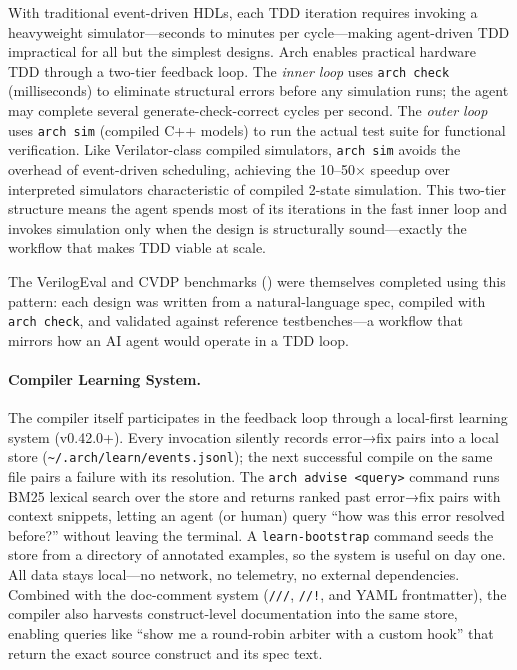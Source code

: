 \documentclass[11pt,twocolumn]{article}
\begin{document}
With traditional event-driven HDLs, each TDD iteration requires invoking a heavyweight simulator---seconds to minutes per cycle---making agent-driven TDD impractical for all but the simplest designs. Arch enables practical hardware TDD through a two-tier feedback loop. The \emph{inner loop} uses \texttt{arch check} (milliseconds) to eliminate structural errors before any simulation runs; the agent may complete several generate-check-correct cycles per second. The \emph{outer loop} uses \texttt{arch sim} (compiled C++ models) to run the actual test suite for functional verification. Like Verilator-class compiled simulators, \texttt{arch sim} avoids the overhead of event-driven scheduling, achieving the 10--50$\times$ speedup over interpreted simulators characteristic of compiled 2-state simulation. This two-tier structure means the agent spends most of its iterations in the fast inner loop and invokes simulation only when the design is structurally sound---exactly the workflow that makes TDD viable at scale.

The VerilogEval and CVDP benchmarks () were themselves completed using this pattern: each design was written from a natural-language spec, compiled with \texttt{arch check}, and validated against reference testbenches---a workflow that mirrors how an AI agent would operate in a TDD loop.

\paragraph{Compiler Learning System.}
The compiler itself participates in the feedback loop through a local-first learning system (v0.42.0+). Every invocation silently records error→fix pairs into a local store (\texttt{\textasciitilde/.arch/learn/events.jsonl}); the next successful compile on the same file pairs a failure with its resolution. The \texttt{arch advise <query>} command runs BM25 lexical search over the store and returns ranked past error→fix pairs with context snippets, letting an agent (or human) query ``how was this error resolved before?'' without leaving the terminal. A \texttt{learn-bootstrap} command seeds the store from a directory of annotated examples, so the system is useful on day one. All data stays local---no network, no telemetry, no external dependencies. Combined with the doc-comment system (\texttt{///}, \texttt{//!}, and YAML frontmatter), the compiler also harvests construct-level documentation into the same store, enabling queries like ``show me a round-robin arbiter with a custom hook'' that return the exact source construct and its spec text.
\end{document}
